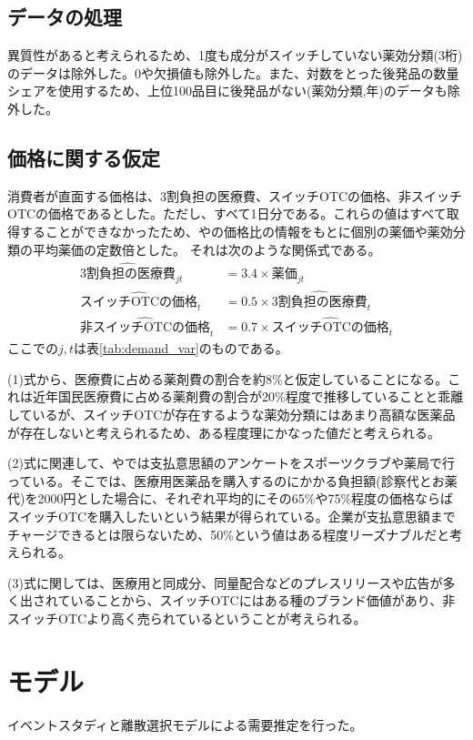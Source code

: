 \documentclass[a4paper,11pt,uplatex]{jsarticle}
\theoremstyle{definition}
\begin{document}
\subsection{データの処理}
異質性があると考えられるため、1度も成分がスイッチしていない薬効分類(3桁)のデータは除外した。0や欠損値も除外した。また、対数をとった後発品の数量シェアを使用するため、上位100品目に後発品がない(薬効分類,年)のデータも除外した。
\subsection{価格に関する仮定}
消費者が直面する価格は、3割負担の医療費、スイッチOTCの価格、非スイッチOTCの価格であるとした。ただし、すべて1日分である。これらの値はすべて取得することができなかったため、\cite{igarashi2021,igarashi2022}や\cite{iseikyoku2021}の価格比の情報をもとに個別の薬価や薬効分類の平均薬価の定数倍とした。 それは次のような関係式である。
\begin{align}
    \widehat {3割負担の医療費}_{jt}&=3.4\times 薬価_{jt}\\
    \widehat {\textrm{スイッチOTCの価格}}_t&=0.5 \times \widehat{\textrm{3割負担の医療費}}_t\\
    \widehat {\textrm{非スイッチOTCの価格}}_t&=0.7 \times \widehat {\textrm{スイッチOTCの価格}}_t
\end{align}
ここでの\(j,t\)は表\ref{tab:demand_var}のものである。

(1)式から、医療費に占める薬剤費の割合を約8\%と仮定していることになる。これは近年国民医療費に占める薬剤費の割合が20\%程度で推移していることと乖離しているが、スイッチOTCが存在するような薬効分類にはあまり高額な医薬品が存在しないと考えられるため、ある程度理にかなった値だと考えられる。

(2)式に関連して、\cite{narui2013}や\cite{narui2016}では支払意思額のアンケートをスポーツクラブや薬局で行っている。そこでは、医療用医薬品を購入するのにかかる負担額(診察代とお薬代)を2000円とした場合に、それぞれ平均的にその65\%や75\%程度の価格ならばスイッチOTCを購入したいという結果が得られている。企業が支払意思額までチャージできるとは限らないため、50\%という値はある程度リーズナブルだと考えられる。

(3)式に関しては、医療用と同成分、同量配合などのプレスリリースや広告が多く出されていることから、スイッチOTCにはある種のブランド価値があり、非スイッチOTCより高く売られているということが考えられる。
\section{モデル}
イベントスタディと離散選択モデルによる需要推定を行った。
\end{document}
